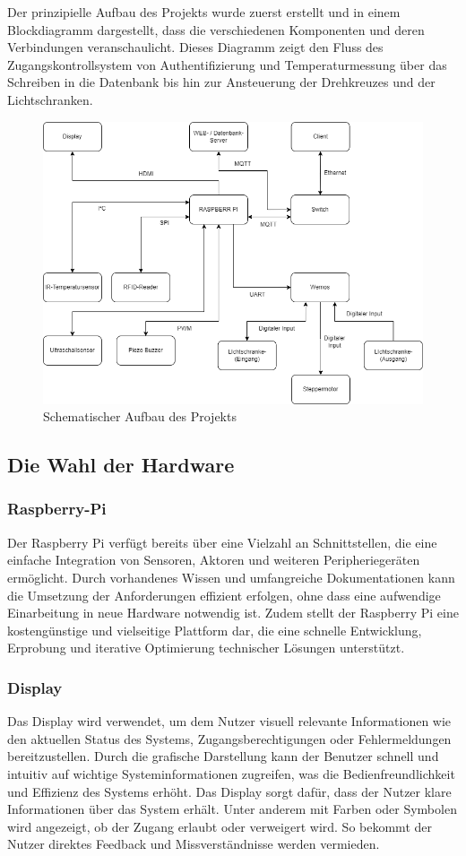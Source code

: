 Der prinzipielle Aufbau des Projekts wurde zuerst erstellt und in einem Blockdiagramm dargestellt, dass die verschiedenen Komponenten und deren Verbindungen veranschaulicht. Dieses Diagramm zeigt den Fluss des Zugangskontrollsystem von Authentifizierung und Temperaturmessung über das Schreiben in die Datenbank bis hin zur Ansteuerung der Drehkreuzes und der Lichtschranken.

\begin{figure}[h]
	\centering
	\includegraphics[width=0.4\linewidth]{figures/Prinzipienschaltbild.png}
	\caption[Prinzipienschaltbild]{Schematischer Aufbau des Projekts}\label{fig:prinzipienschaltbild}
\end{figure}


\subsection{Die Wahl der Hardware}
\label{subsec:die_wahl_der_hardware}

\subsubsection{Raspberry-Pi}

Der Raspberry Pi verfügt bereits über eine Vielzahl an Schnittstellen, die eine einfache Integration von Sensoren, Aktoren und weiteren Peripheriegeräten ermöglicht. Durch vorhandenes Wissen und umfangreiche Dokumentationen kann die Umsetzung der Anforderungen effizient erfolgen, ohne dass eine aufwendige Einarbeitung in neue Hardware notwendig ist. Zudem stellt der Raspberry Pi eine kostengünstige und vielseitige Plattform dar, die eine schnelle Entwicklung, Erprobung und iterative Optimierung technischer Lösungen unterstützt.

\subsubsection{Display}

Das Display wird verwendet, um dem Nutzer visuell relevante Informationen wie den aktuellen Status des Systems, Zugangsberechtigungen oder Fehlermeldungen bereitzustellen. Durch die grafische Darstellung kann der Benutzer schnell und intuitiv auf wichtige Systeminformationen zugreifen, was die Bedienfreundlichkeit und Effizienz des Systems erhöht. Das Display sorgt dafür, dass der Nutzer klare Informationen über das System erhält. Unter anderem mit Farben oder Symbolen wird angezeigt, ob der Zugang erlaubt oder verweigert wird. So bekommt der Nutzer direktes Feedback und Missverständnisse werden vermieden.

